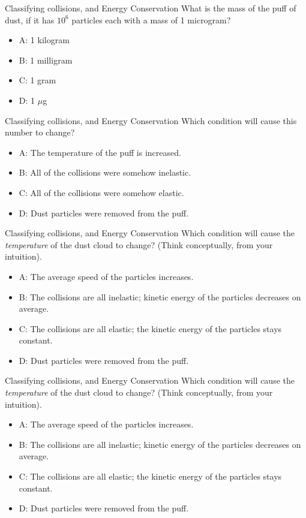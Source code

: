 \documentclass{beamer}
\begin{document}
\begin{frame}{Classifying collisions, and Energy Conservation}
What is the mass of the puff of dust, if it has $10^6$ particles each with a mass of 1 microgram?  
\begin{itemize}
\item A: 1 kilogram
\item B: 1 milligram
\item C: 1 gram
\item D: 1 $\mu$g
\end{itemize}
\end{frame}

\begin{frame}{Classifying collisions, and Energy Conservation}
Which condition will cause this number to change?
\begin{itemize}
\item A: The temperature of the puff is increased.
\item B: All of the collisions were somehow inelastic.
\item C: All of the collisions were somehow elastic.
\item D: Dust particles were removed from the puff.
\end{itemize}
\end{frame}

\begin{frame}{Classifying collisions, and Energy Conservation}
Which condition will cause the \textit{temperature} of the dust cloud to change?  (Think conceptually, from your intuition).
\begin{itemize}
\item A: The average speed of the particles increases.
\item B: The collisions are all inelastic; kinetic energy of the particles decreases on average.
\item C: The collisions are all elastic; the kinetic energy of the particles stays constant.
\item D: Dust particles were removed from the puff.
\end{itemize}
\end{frame}

\begin{frame}{Classifying collisions, and Energy Conservation}
Which condition will cause the \textit{temperature} of the dust cloud to change?  (Think conceptually, from your intuition).
\begin{itemize}
\item A: The average speed of the particles increases.
\item B: The collisions are all inelastic; kinetic energy of the particles decreases on average.
\item C: The collisions are all elastic; the kinetic energy of the particles stays constant.
\item D: Dust particles were removed from the puff.
\end{itemize}
\end{frame}
\end{document}
